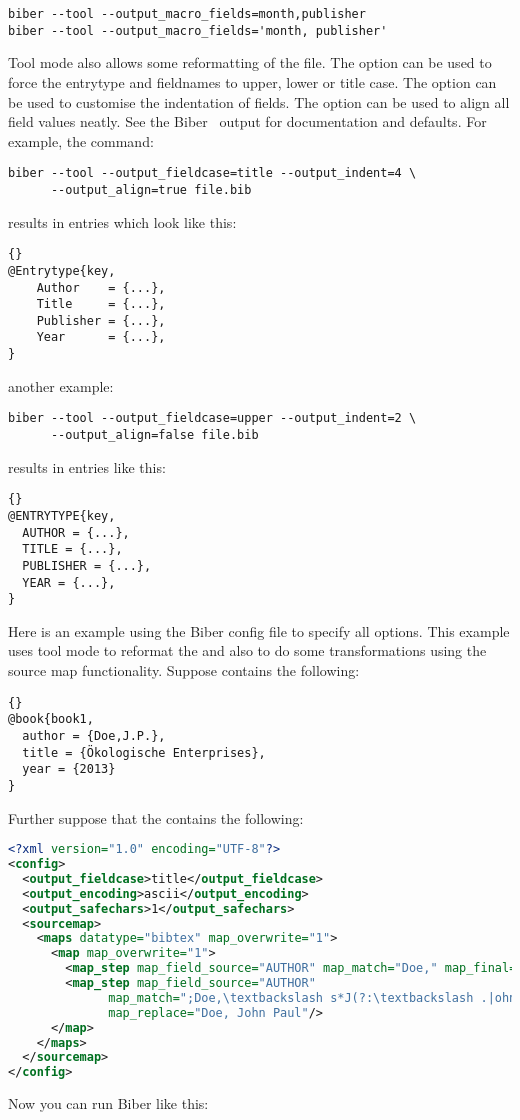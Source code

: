 \documentclass{ltxdockit}
\newcommand*{\biber}{Biber\xspace}
\begin{document}
\begin{verbatim}
biber --tool --output_macro_fields=month,publisher
biber --tool --output_macro_fields='month, publisher'
\end{verbatim}

Tool mode also allows some reformatting of the  file. The
option  can be used to force the entrytype and
fieldnames to upper, lower or title case. The option
 can be used to customise the indentation of
fields. The option  can be used to align all field
values neatly. See the \biber\  output for documentation
and defaults. For example, the command:

\begin{verbatim}
biber --tool --output_fieldcase=title --output_indent=4 \
      --output_align=true file.bib
\end{verbatim}
%
results in  entries which look like this:

\begin{lstlisting}[style=bibtex, columns=fixed]{}
@Entrytype{key,
    Author    = {...},
    Title     = {...},
    Publisher = {...},
    Year      = {...},
}
\end{lstlisting}
%
another example:
\begin{verbatim}
biber --tool --output_fieldcase=upper --output_indent=2 \
      --output_align=false file.bib
\end{verbatim}
%
results in entries like this:

\begin{lstlisting}[style=bibtex]{}
@ENTRYTYPE{key,
  AUTHOR = {...},
  TITLE = {...},
  PUBLISHER = {...},
  YEAR = {...},
}
\end{lstlisting}
%
Here is an example using the \biber config file to specify all options.
This example uses tool mode to reformat the  and also to do some
transformations using the source map functionality. Suppose
\file{test.bib} contains the following:

\begin{lstlisting}[style=bibtex]{}
@book{book1,
  author = {Doe,J.P.},
  title = {Ökologische Enterprises},
  year = {2013}
}
\end{lstlisting}
%
Further suppose that the  contains the following:

\begin{lstlisting}[language=xml,escapechar=;,mathescape=true]
<?xml version="1.0" encoding="UTF-8"?>
<config>
  <output_fieldcase>title</output_fieldcase>
  <output_encoding>ascii</output_encoding>
  <output_safechars>1</output_safechars>
  <sourcemap>
    <maps datatype="bibtex" map_overwrite="1">
      <map map_overwrite="1">
        <map_step map_field_source="AUTHOR" map_match="Doe," map_final="1"/>
        <map_step map_field_source="AUTHOR"
              map_match=";Doe,\textbackslash s*J(?:\textbackslash .|ohn)(?:[-]*)(?:P\textbackslash .|Paul)*;"
              map_replace="Doe, John Paul"/>
      </map>
    </maps>
  </sourcemap>
</config>
\end{lstlisting}
%
Now you can run \biber like this:
\end{document}
